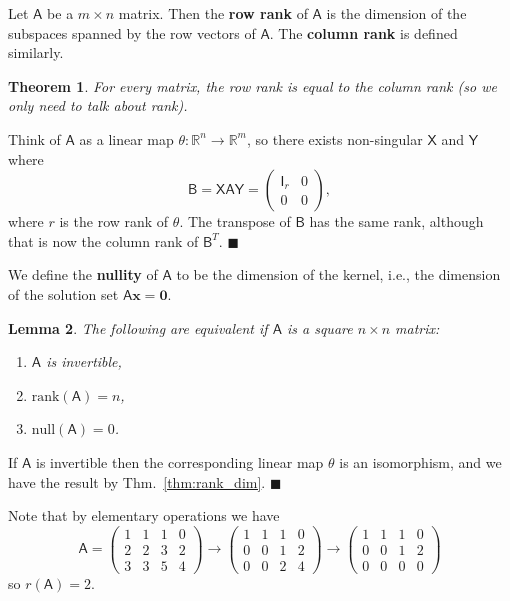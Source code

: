 \documentclass[letter-paper]{tufte-book}
\newtheorem{theorem}{\color{pastel-blue}Theorem}[section]
\newtheorem{lemma}[theorem]{\color{pastel-blue}Lemma}
\newenvironment{proof}[1][Proof]{\begin{trivlist}
\item[\hskip \labelsep {\bfseries #1}]}{\end{trivlist}}
\newenvironment{example}[1][Example]{\begin{trivlist}
\item[\hskip \labelsep {\bfseries #1}]}{\end{trivlist}}
\newcommand{\As}{{\mathsf{A}}}
\newcommand{\Bs}{{\mathsf{B}}}
\newcommand{\Is}{{\mathsf{I}}}
\newcommand{\Xs}{{\mathsf{X}}}
\newcommand{\Ys}{{\mathsf{Y}}}
\newcommand{\Ob}{{\boldsymbol{0}}}
\newcommand{\xb}{{\boldsymbol{x}}}
\newcommand{\qed}{\hfill$\blacksquare$}
\begin{document}
Let $\As$ be a $m\times n$ matrix. Then the \textbf{row rank} of $\As$ is the
dimension of the subspaces spanned by the row vectors of $\As$. The
\textbf{column rank} is defined similarly.

\begin{theorem}
  For every matrix, the row rank is equal to the column rank (so we only need to
  talk about \emph{rank}).
\end{theorem}

\begin{proof}
  Think of $\As$ as a linear map $\theta: \mathbb{R}^n \to \mathbb{R}^m$, so
  there exists non-singular $\Xs$ and $\Ys$ where
  \begin{equation*}
    \Bs = \Xs \As \Ys = \begin{pmatrix}\Is_r & 0 \\ 0 & 0 \end{pmatrix},
  \end{equation*}
  where $r$ is the row rank of $\theta$. The transpose of $\Bs$ has the same
  rank, although that is now the column rank of $\Bs^T$. \qed
\end{proof}

We define the \textbf{nullity} of $\As$ to be the dimension of the kernel, i.e.,
the dimension of the solution set $\As\xb = \Ob$.

\begin{lemma}
  The following are equivalent if $\As$ is a square $n\times n$ matrix:
  \begin{enumerate}
    \item $\As$ is invertible,
    \item $\mbox{rank}(\As) = n$,
    \item $\mbox{null}(\As) = 0$.
  \end{enumerate}
\end{lemma}

\begin{proof}
  If $\As$ is invertible then the corresponding linear map $\theta$ is an
  isomorphism, and we have the result by Thm.~\ref{thm:rank_dim}. \qed
\end{proof}

\begin{example}
  Note that by elementary operations we have
  \begin{equation*}
    \As = \begin{pmatrix} 
      1 & 1 & 1 & 0 \\
      2 & 2 & 3 & 2 \\
      3 & 3 & 5 & 4
    \end{pmatrix} 
    \to \begin{pmatrix} 
      1 & 1 & 1 & 0 \\
      0 & 0 & 1 & 2 \\
      0 & 0 & 2 & 4
    \end{pmatrix} 
    \to \begin{pmatrix} 
      1 & 1 & 1 & 0 \\
      0 & 0 & 1 & 2 \\
      0 & 0 & 0 & 0
    \end{pmatrix}
  \end{equation*}
  so $r(\As) = 2$.
\end{example}
\end{document}
